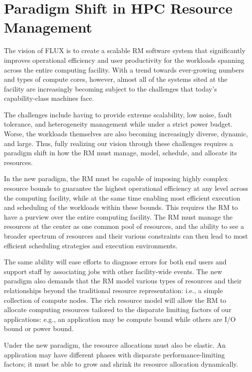 \section{Paradigm Shift in HPC Resource Management}
The vision of FLUX is to create a scalable RM
software system that significantly improves
operational efficiency and user productivity
for the workloads spanning across the entire
computing facility.
With a trend towards ever-growing numbers and
types of compute cores, however, almost all of 
the systems sited at the facility are increasingly
becoming subject to the challenges
that today's capability-class machines face.
\ifcomments
{}

The challenges include having to provide extreme
scalability, low noise, fault tolerance, 
and heterogeneity management while under a strict power budget.
Worse, the workloads themselves are also becoming
increasingly diverse, dynamic, and large.
Thus, fully realizing our vision through
these challenges requires a paradigm shift
in how the RM must manage, model, schedule, 
and allocate its resources.

In the new paradigm, the RM must be capable of
imposing highly complex resource bounds
to guarantee the highest operational efficiency
at any level across the computing facility, 
while at the same time enabling most efficient
execution and scheduling of the workloads
within these bounds.
This requires the RM to have a purview over 
the entire computing facility. 
The RM must manage the resources at the center
as one common pool of resources, and the ability
to see a broader spectrum of resources
and their various constraints can then lead to
most efficient scheduling strategies
and execution environments. 

The same ability will ease efforts to diagnose errors
for both end users and support staff by associating jobs
with other facility-wide events. The new paradigm 
also demands that the RM model various types of
resources and their relationships beyond the traditional
resource representation: i.e., a simple collection
of compute nodes. The rich resource model will allow
the RM to allocate computing resources tailored
to the disparate limiting factors
of our applications: e.g., an application
may be compute bound while others are I/O bound 
or power bound.

Under the new paradigm, the resource allocations
must also be elastic. An application may have different
phases with disparate performance-limiting factors;
it must be able to grow and shrink its resource allocation
dynamically.


